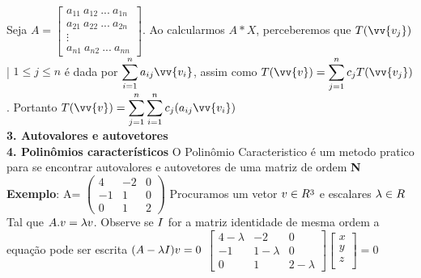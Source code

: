 \documentclass[11pt,a4paper]{article}
\newcommand\tab[1][1.835cm]{\hspace*{#1}}
\begin{document}
\begin{flushleft}
\tab Seja $A = \begin{bmatrix} a_{11} \ a_{12} \ ... \ a_{1n} \\ a_{21} \ a_{22} \ ... \ a_{2n} \\ \vdots \\ a_{n1} \ a_{n2} \ ... \ a_{nn} \end{bmatrix}$. Ao calcularmos $A*X$, perceberemos que $ T(\vv{v_j})$ | $ 1 \leq j \leq n  $ é dada por $ \displaystyle\sum_{i=1}^n a_{ij}\vv{v_i} $, assim como $T(\vv{v}) = \displaystyle\sum_{j=1}^n c_jT(\vv{v_j}) $. Portanto $T(\vv{v}) = \displaystyle\sum_{j=1}^n \displaystyle\sum_{i=1}^n c_j(a_{ij}\vv{v_i})$ \linebreak 
\\
\textbf{3. Autovalores e autovetores}\linebreak
\\
\textbf{4. Polinômios característicos}\linebreak
\tab 
O Polinômio Caracteristico é um metodo pratico para se encontrar autovalores e autovetores de uma matriz  de ordem \textbf{N}\newline
\textbf{Exemplo}:\newline\newline
A= $
 \begin{pmatrix}
  4 & -2 &  0\\
  -1& 1 & 0 \\
  0& 1 & 2
 \end{pmatrix}
$\vspace*{3mm}\newline
Procuramos um vetor $\mathnormal{v}\in\mathnormal{R^3}$  e escalares $\lambda\in\mathnormal{R}$ Tal que $\mathnormal{A}. \mathnormal {v}= \lambda\mathnormal{v}$. Observe se  $\mathnormal {I}$ for a matriz identidade de mesma ordem a equação pode ser escrita $(\mathnormal {A}-\lambda\mathnormal {I})\mathnormal {v}=0$ \vspace*{3mm}\newline
$\begin{bmatrix*} 4 -\lambda& -2 &  0\\  -1& 1-\lambda & 0 \\  0& 1 & 2-\lambda \end{bmatrix*} \begin{bmatrix}
x\\y\\z\\
\end{bmatrix}=0 $\vspace*{3mm}\newline

\end{flushleft}
\end{document}
